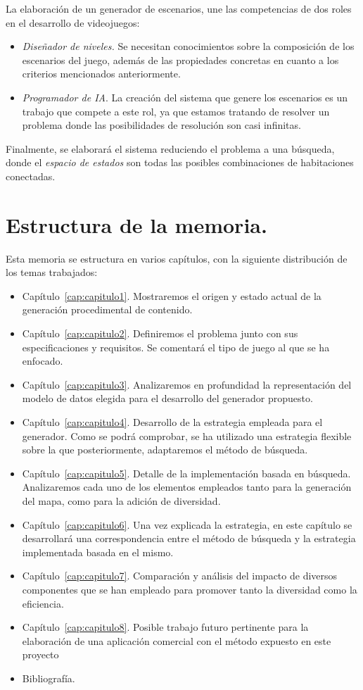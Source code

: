 La elaboración de un generador de escenarios, une las competencias de dos roles en el desarrollo de videojuegos:

\begin{itemize}
	\item \emph{Diseñador de niveles.} Se necesitan conocimientos sobre la composición de los escenarios del juego, además de las propiedades concretas en cuanto a los criterios mencionados anteriormente.
	\item \emph{Programador de IA}. La creación del sistema que genere los escenarios es un trabajo que compete a este rol, ya que estamos tratando de resolver un problema donde las posibilidades de resolución son casi infinitas.
\end{itemize}

Finalmente, se elaborará el sistema reduciendo el problema a una búsqueda, donde el \emph{espacio de estados} son todas las posibles combinaciones de habitaciones conectadas.

\section*{Estructura de la memoria.}

Esta memoria se estructura en varios capítulos, con la siguiente distribución de los temas trabajados:

\begin{itemize}
	\item Capítulo~\ref{cap:capitulo1}. Mostraremos el origen y estado actual de la generación procedimental de contenido.
	\item Capítulo~\ref{cap:capitulo2}. Definiremos el problema junto con sus especificaciones y requisitos. Se comentará el tipo de juego al que se ha enfocado.
	\item Capítulo~\ref{cap:capitulo3}. Analizaremos en profundidad la representación del modelo de datos elegida para el desarrollo del generador propuesto.
	\item Capítulo~\ref{cap:capitulo4}. Desarrollo de la estrategia empleada para el generador. Como se podrá comprobar, se ha utilizado una estrategia flexible sobre la que posteriormente, adaptaremos el método de búsqueda.
	\item Capítulo~\ref{cap:capitulo5}. Detalle de la implementación basada en búsqueda. Analizaremos cada uno de los elementos empleados tanto para la generación del mapa, como para la adición de diversidad.
	\item Capítulo~\ref{cap:capitulo6}. Una vez explicada la estrategia, en este capítulo se desarrollará una correspondencia entre el método de búsqueda y la estrategia implementada basada en el mismo.
	\item Capítulo~\ref{cap:capitulo7}. Comparación y análisis del impacto de diversos componentes que se han empleado para promover tanto la diversidad como la eficiencia.
	\item Capítulo~\ref{cap:capitulo8}. Posible trabajo futuro pertinente para la elaboración de una aplicación comercial con el método expuesto en este proyecto
	\item Bibliografía.
\end{itemize}
